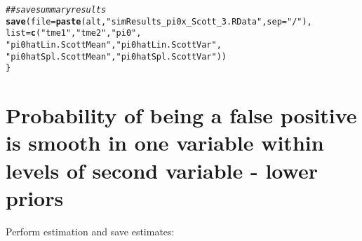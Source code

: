 \documentclass{article}\usepackage[]{graphicx}\usepackage[]{color}
\makeatletter
\newcommand{\hlstr}[1]{\textcolor[rgb]{0.192,0.494,0.8}{#1}}%
\newcommand{\hlcom}[1]{\textcolor[rgb]{0.678,0.584,0.686}{\textit{#1}}}%
\newcommand{\hlstd}[1]{\textcolor[rgb]{0.345,0.345,0.345}{#1}}%
\newcommand{\hlkwc}[1]{\textcolor[rgb]{0.333,0.667,0.333}{#1}}%
\newcommand{\hlkwd}[1]{\textcolor[rgb]{0.737,0.353,0.396}{\textbf{#1}}}%
\newenvironment{kframe}{%
 \def\at@end@of@kframe{}%
 \ifinner\ifhmode%
  \def\at@end@of@kframe{\end{minipage}}%
  \begin{minipage}{\columnwidth}%
 \fi\fi%
 \def\FrameCommand##1{\hskip\@totalleftmargin \hskip-\fboxsep
 \colorbox{shadecolor}{##1}\hskip-\fboxsep
     \hskip-\linewidth \hskip-\@totalleftmargin \hskip\columnwidth}%
 \MakeFramed {\advance\hsize-\width
   \@totalleftmargin\z@ \linewidth\hsize
   \@setminipage}}%
 {\par\unskip\endMakeFramed%
 \at@end@of@kframe}
\newenvironment{knitrout}{}{} %
\makeatother
\begin{document}
\begin{knitrout}
\begin{kframe}
\begin{alltt}
  \hlcom{##save summary results}
  \hlkwd{save}\hlstd{(}\hlkwc{file}\hlstd{=}\hlkwd{paste}\hlstd{(alt,}\hlstr{"simResults_pi0x_Scott_3.RData"}\hlstd{,}\hlkwc{sep}\hlstd{=}\hlstr{"/"}\hlstd{),}
       \hlkwc{list}\hlstd{=}\hlkwd{c}\hlstd{(}\hlstr{"tme1"}\hlstd{,} \hlstr{"tme2"}\hlstd{,} \hlstr{"pi0"}\hlstd{,}
              \hlstr{"pi0hatLin.ScottMean"}\hlstd{,} \hlstr{"pi0hatLin.ScottVar"}\hlstd{,}
              \hlstr{"pi0hatSpl.ScottMean"}\hlstd{,} \hlstr{"pi0hatSpl.ScottVar"}\hlstd{))}
\hlstd{\}}
\end{alltt}
\end{kframe}
\end{knitrout}

\section{Probability of being a false positive is smooth in one variable within levels of second variable - lower priors}

Perform estimation and save estimates:
\end{document}
